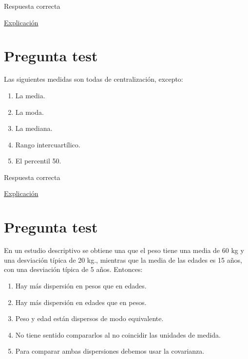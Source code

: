 \documentclass[
]{book}
\providecommand{\tightlist}{%
  \setlength{\itemsep}{0pt}\setlength{\parskip}{0pt}}
\begin{document}
Respuesta correcta

\href{https://1fjmanzano.github.io/bioestadistica/medidas-de-posicio\%CC\%81n-dispersio\%CC\%81n-y-forma.html\#medidas-de-posicio\%CC\%81n-centrales}{Explicación}

\hypertarget{pregunta-test-63}{%
\section{Pregunta test}\label{pregunta-test-63}}

Las siguientes medidas son todas de centralización, excepto:

\begin{enumerate}
\def\labelenumi{\alph{enumi})}
\tightlist
\item
  La media.
\item
  La moda.
\item
  La mediana.
\item
  Rango intercuartílico.
\item
  El percentil 50.
\end{enumerate}

Respuesta correcta

\href{https://1fjmanzano.github.io/bioestadistica/medidas-de-posicio\%CC\%81n-dispersio\%CC\%81n-y-forma.html\#medidas-de-posicio\%CC\%81n-centrales}{Explicación}

\hypertarget{pregunta-test-64}{%
\section{Pregunta test}\label{pregunta-test-64}}

En un estudio descriptivo se obtiene una que el peso tiene una media de 60 kg y una desviación típica de 20 kg., mientras que la media de las edades es 15 años, con una desviación típica de 5 años. Entonces:

\begin{enumerate}
\def\labelenumi{\alph{enumi})}
\tightlist
\item
  Hay más dispersión en pesos que en edades.
\item
  Hay más dispersión en edades que en pesos.
\item
  Peso y edad están dispersos de modo equivalente.
\item
  No tiene sentido compararlos al no coincidir las unidades de medida.
\item
  Para comparar ambas dispersiones debemos usar la covarianza.
\end{enumerate}
\end{document}
